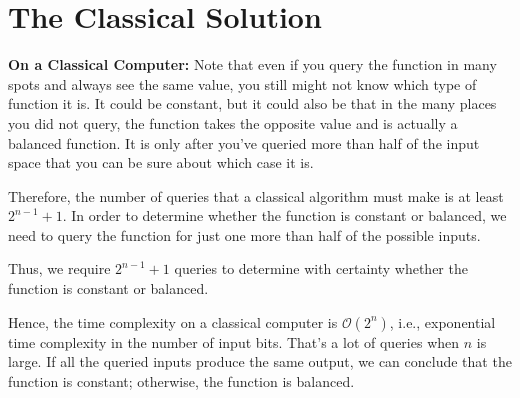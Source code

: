 \section{The Classical Solution}

\textbf{On a Classical Computer: } Note that even if you query the function in many spots and always see the same value, you still might not know which type of function it is. It could be constant, but it could also be that in the many places you did not query, the function takes the opposite value and is actually a balanced function. It is only after you've queried more than half of the input space that you can be sure about which case it is. 

Therefore, the number of queries that a classical algorithm must make is at least $2^{n-1} + 1$. In order to determine whether the function is constant or balanced, we need to query the function for just one more than half of the possible inputs.

Thus, we require $2^{n-1} + 1$ queries to determine with certainty whether the function is constant or balanced.

Hence, the time complexity on a classical computer is $\mathcal{O}(2^n)$, i.e., exponential time complexity in the number of input bits. That's a lot of queries when $n$ is large. If all the queried inputs produce the same output, we can conclude that the function is constant; otherwise, the function is balanced.

